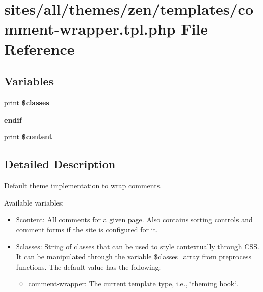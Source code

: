 \hypertarget{sites_2all_2themes_2zen_2templates_2comment-wrapper_8tpl_8php}{
\section{sites/all/themes/zen/templates/comment-wrapper.tpl.php File Reference}
\label{sites_2all_2themes_2zen_2templates_2comment-wrapper_8tpl_8php}
}
\subsection*{Variables}
\begin{CompactItemize}
\item 
\hypertarget{sites_2all_2themes_2zen_2templates_2comment-wrapper_8tpl_8php_6d48ecbdbc70ca1812e665169b5fa1e2}{
print \textbf{\$classes}}
\label{sites_2all_2themes_2zen_2templates_2comment-wrapper_8tpl_8php_6d48ecbdbc70ca1812e665169b5fa1e2}

\item 
\hypertarget{sites_2all_2themes_2zen_2templates_2comment-wrapper_8tpl_8php_82cd33ca97ff99f2fcc5e9c81d65251b}{
\textbf{endif}}
\label{sites_2all_2themes_2zen_2templates_2comment-wrapper_8tpl_8php_82cd33ca97ff99f2fcc5e9c81d65251b}

\item 
\hypertarget{sites_2all_2themes_2zen_2templates_2comment-wrapper_8tpl_8php_b7b7210f43aa78e34f0b202de894a74c}{
print \textbf{\$content}}
\label{sites_2all_2themes_2zen_2templates_2comment-wrapper_8tpl_8php_b7b7210f43aa78e34f0b202de894a74c}

\end{CompactItemize}


\subsection{Detailed Description}
Default theme implementation to wrap comments.

Available variables:\begin{itemize}
\item \$content: All comments for a given page. Also contains sorting controls and comment forms if the site is configured for it.\item \$classes: String of classes that can be used to style contextually through CSS. It can be manipulated through the variable \$classes\_\-array from preprocess functions. The default value has the following:\begin{itemize}
\item comment-wrapper: The current template type, i.e., \char`\"{}theming hook\char`\"{}.\end{itemize}
\end{itemize}


